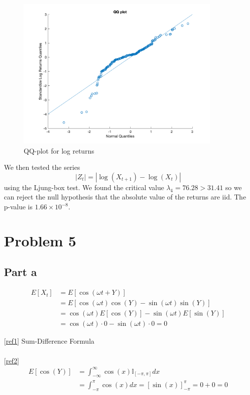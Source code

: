 \documentclass{article}
\begin{document}
\begin{figure}[H]
\includegraphics[width=10cm]{plots/qqplot.png}
\centering
\caption{QQ-plot for log returns}
\label{fig:qqplot}
\end{figure}

We then tested the series
$$
|Z_t| = |\log(X_{t + 1}) - \log(X_t)|
$$
using the Ljung-box test.
We found the critical value $\lambda_4 = 76.28 > 31.41$ so we can reject the null hypothesis that the absolute value of the returns are iid.
The p-value is $1.66 \times 10^{-8}$.

\section*{Problem 5}
\subsection*{Part a}

\begin{align}
    E[X_t] &= E[\cos(\omega t + Y)] \nonumber\\
    &= E[\cos(\omega t) \cos(Y) - \sin(\omega t) \sin(Y)]  \label{ref1}\\
    &= \cos(\omega t) E[\cos(Y)] - \sin(\omega t) E[\sin(Y)] \nonumber\\
    &= \cos(\omega t) \cdot 0 - \sin(\omega t) \cdot 0 = 0  \label{ref2}
\end{align}

\noindent \eqref{ref1} Sum-Difference Formula \\
\\
\eqref{ref2}
\begin{align*}
E[\cos(Y)] &= \int_{-\infty}^{\infty} \cos(x) \mathbb{I}_{[-\pi, \pi]} dx \\
&= \int_{-\pi}^{\pi} \cos(x) dx = [\sin(x)]^{\pi}_{-\pi} = 0 + 0 = 0
\end{align*}
\end{document}
